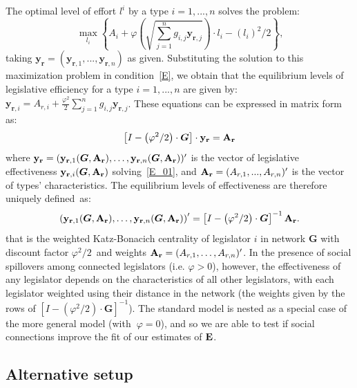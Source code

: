 \documentclass[nojss]{jss}
\begin{document}
The optimal level of effort $l^{i}$ by a type $i=1,...,n$ solves the
problem: 
\begin{equation}
	\max\limits_{l_{i}}\left\{ A_{i}+\varphi \left( \sqrt{\sum_{j=1}^{n}g_{i,j}\mathbf{y}_{\mathbf{r}, j}}\right) \cdot l_{i}-\left( l_{i}\right)
	^{2}/2\right\} \text{,}  \label{E_0}
\end{equation}%
taking $\mathbf{y}_{\mathbf{r}}=(\mathbf{y}_{\mathbf{r}, 1},...,\mathbf{y}_{\mathbf{r}, n})$ as given. Substituting the solution to
this maximization problem in condition~\ref{E}, we obtain that the
equilibrium levels of legislative efficiency for a type $i=1,...,n$ are
given by: $\mathbf{y}_{\mathbf{r}, i}=A_{r, i}+\frac{\varphi ^{2}}{2}\sum_{j=1}^{n}g_{i,j}\mathbf{y}_{\mathbf{r}, j}$. These equations can be expressed in matrix
form as:%
\begin{equation}
	\left[ I-\left( \varphi ^{2}/2\right) \cdot \boldsymbol{G}\right] \cdot \mathbf{y}_{\mathbf{r}}={\bf A_r}
	\label{E_01}
\end{equation}%
where $\mathbf{y}_{\mathbf{r}}=(\mathbf{y}_{\mathbf{r}, 1}(\boldsymbol{G},{\bf A_r}),\dots,\mathbf{y}_{\mathbf{r}, n}(\boldsymbol{G},{\bf A_r}))^{\prime }$ is the vector of legislative effectiveness $\mathbf{y}_{\mathbf{r}, i}(\boldsymbol{G},{\bf A_r})$ solving~\ref{E_01}, and ${\bf A_r}=(A_{r,1},...,A_{r,n})^{\prime}$ is the vector of types' characteristics. The equilibrium levels of effectiveness are therefore uniquely defined\ as: 
\[
{\bf (}\mathbf{y}_{\mathbf{r}, 1}(\boldsymbol{G},{\bf A_r}),\dots,\mathbf{y}_{\mathbf{r}, n}(\boldsymbol{G},{\bf A_r}){\bf )}^{\prime }=\left[
I-\left( \varphi ^{2}/2\right) \cdot \boldsymbol{G}\right] ^{-1}{\bf A_r.}
\]%
that is the weighted Katz-Bonacich centrality of legislator $i$ in network $\boldsymbol{G}
$ with discount factor $\varphi ^{2}/2$\ and weights ${\bf A_r}=(A_{r,1},\dots,A_{r,n})^{\prime}$. In the presence of social spillovers among connected legislators (i.e. $\varphi >0$), however, the effectiveness of any legislator depends on the characteristics of all other legislators, with each legislator weighted using their distance in the network (the weights given by the rows of $\left[I-\left( \varphi ^{2}/2\right) \cdot \boldsymbol{G}\right] ^{-1}$). The standard model is nested as a special case of the more general model (with{\bf \ }$\varphi =0$), and so we are able to test if social connections improve the fit of our estimates of ${\bf E}$.

\subsection{Alternative setup}\label{sec:alternative}
\end{document}

